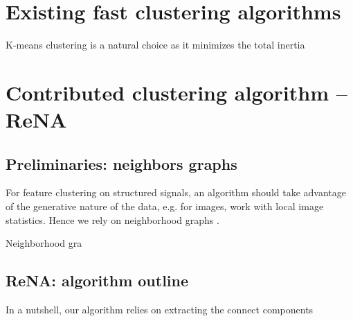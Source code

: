 \section{Existing fast clustering algorithms}
%
K-means clustering is a natural choice as it minimizes the total
inertia


\section{Contributed clustering algorithm -- ReNA}
%
\subsection{Preliminaries: neighbors graphs}
%
For feature clustering on structured signals, an algorithm should take 
advantage of the generative nature of the data, e.g. for images,
work with local image statistics. 
%
Hence we rely on neighborhood graphs \citep{Eppstein1997}.

Neighborhood gra

\subsection{ReNA: algorithm outline}
%
In a nutshell, our algorithm relies on extracting the connect components
